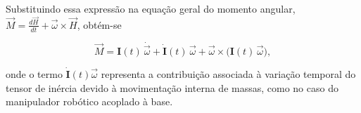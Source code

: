 Substituindo essa expressão na equação geral do momento angular, 
$\vec{M} = \frac{d\vec{H}}{dt} + \vec{\omega}\times\vec{H}$, obtém-se

\begin{equation}
\vec{M} = \mathbf{I}(t)\,\dot{\vec{\omega}} + \dot{\mathbf{I}}(t)\,\vec{\omega} + 
\vec{\omega}\times\big(\mathbf{I}(t)\,\vec{\omega}\big),
\label{eq:euler_inercia_variavel}
\end{equation}

onde o termo $\dot{\mathbf{I}}(t)\vec{\omega}$ representa a contribuição associada 
à variação temporal do tensor de inércia devido à movimentação interna de massas, 
como no caso do manipulador robótico acoplado à base.






